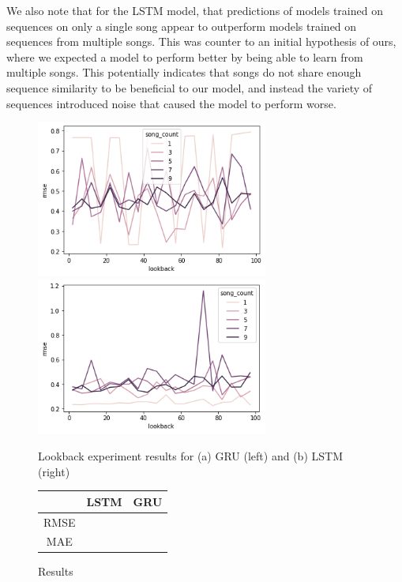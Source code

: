 \documentclass[11pt]{article}
\begin{document}
We also note that for the LSTM model, that predictions of models trained on sequences on only a single song appear to outperform models trained on sequences from multiple songs. This was counter to an initial hypothesis of ours, where we expected a model to perform better by being able to learn from multiple songs. This potentially indicates that songs do not share enough sequence similarity to be beneficial to our model, and instead the variety of sequences introduced noise that caused the model to perform worse. 


\begin{figure}[H]
    \centering
    \includegraphics[width=3in]{figs/gru_lookback}
    \includegraphics[width=3in]{figs/lstm_lookback}
    \caption{Lookback experiment results for (a) GRU (left) and (b) LSTM (right)}
    \label{lookbackfig}
\end{figure}


\begin{figure}[h]
    \centering
    \begin{tabular}{| c  c  c |}
        \hline
         & LSTM  & GRU \\ 
         \hline 
         RMSE & & \\ 
         MAE & & \\  
         \hline
    \end{tabular}
    \caption{Results}
    \label{singleinputresults}
\end{figure}
\end{document}
